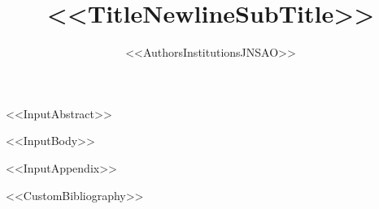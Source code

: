 \documentclass[%
english,
<<DocumentClassOptions>>]{jnsao}
\title{<<TitleNewlineSubTitle>>}
\author{%
<<AuthorsInstitutionsJNSAO>>
}
\begin{document}
\maketitle

<<InputAbstract>>

<<InputBody>>

\appendix
<<InputAppendix>>


<<CustomBibliography>>
\end{document}
